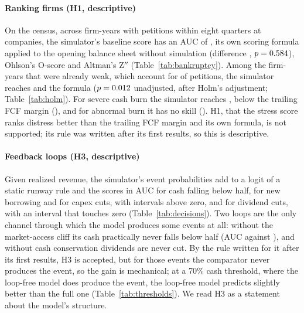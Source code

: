 \documentclass[preprint,12pt,authoryear]{elsarticle}
\begin{document}
\paragraph{Ranking firms (H1, descriptive)} On the census, across \BkPanN{} firm-years with \BkPanEv{} petitions within eight quarters at \BkPanFirms{} companies, the simulator's baseline score has an AUC of \BkPanTwin, its own scoring formula applied to the opening balance sheet without simulation \BkPanFormula{} (difference \BkPanFormulaDiff, $p=0.584$), Ohlson's O-score \BkPanOhlson{} and Altman's Z$''$ \BkPanAltman{} (Table~\ref{tab:bankruptcy}). Among the \BkWeakN{} firm-years that were already weak, which account for \BkWeakShare{} of petitions, the simulator reaches \BkWeakTwin{} and the formula \BkWeakFormula{} ($p=0.012$ unadjusted, \HolmWeak{} after Holm's adjustment; Table~\ref{tab:holm}). For severe cash burn the simulator reaches \PanTwinAuc, below the trailing FCF margin (\PanFcfAuc), and for abnormal burn it has no skill (\PanAbnTwinAuc). H1, that the stress score ranks distress better than the trailing FCF margin and its own formula, is not supported; its rule was written after its first results, so this is descriptive.

\paragraph{Feedback loops (H3, descriptive)} Given realized revenue, the simulator's event probabilities add to a logit of a static runway rule and the scores \DecCashDelta{} in AUC for cash falling below half, \DecDebtDelta{} for new borrowing and \DecCapexDelta{} for capex cuts, with intervals above zero, and \DecDivDelta{} for dividend cuts, with an interval that touches zero (Table~\ref{tab:decisions}). Two loops are the only channel through which the model produces some events at all: without the market-access cliff its cash practically never falls below half (AUC \DecCashNoRtwo{} against \DecCashTwin), and without cash conservation dividends are never cut. By the rule written for it after its first results, H3 is accepted, but for those events the comparator never produces the event, so the gain is mechanical; at a 70\% cash threshold, where the loop-free model does produce the event, the loop-free model predicts slightly better than the full one (Table~\ref{tab:thresholds}). We read H3 as a statement about the model's structure.
\end{document}
